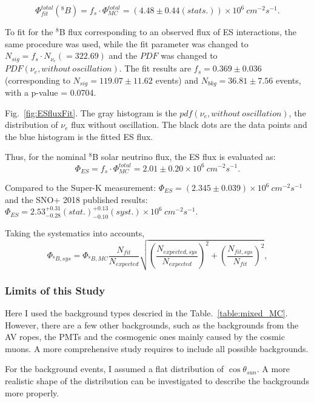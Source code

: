 \begin{equation}
\Phi^{total}_{fit}(^8 B)=f_s\cdot \Phi^{total}_{MC}=(4.48\pm 0.44(stats.))\times 10^6~cm^{-2}s^{-1}.
\end{equation}

To fit for the $^8$B flux corresponding to an observed flux of ES interactions, the same procedure was used, while the fit parameter was changed to $N_{sig}=f_s\cdot N_{\nu_e}(=322.69)$ and the $PDF$ was changed to $PDF(\nu_e,without~oscillation)$. The fit results are $f_s=0.369\pm 0.036$ (corresponding to $N_{sig}=119.07\pm11.62$ events) and $N_{bkg}=36.81\pm 7.56$ events, with a p-value = 0.0704.

Fig.~\ref{fig:ESfluxFit}. The gray histogram is the $pdf(\nu_e,without~oscillation)$, the distribution of $\nu_e$ flux without oscillation. The black dots are the data points and the blue histogram is the fitted ES flux.

Thus, for the nominal $^8$B solar neutrino flux, the ES flux is evaluated as:
\begin{equation}
\Phi_{ES}=f_s\cdot \Phi^{total}_{MC}=2.01\pm 0.20\times 10^6~cm^{-2}s^{-1}.
\end{equation}


Compared to the Super-K measurement: $\Phi_{ES}=(2.345\pm0.039)\times 10^6~cm^{-2}s^{-1}$ and the SNO+ 2018 published results: $\Phi_{ES}=2.53^{+0.31}_{-0.28}(stat.)^{+0.13}_{-0.10}(syst.)\times 10^6~cm^{-2}s^{-1}$.



Taking the systematics into accounts,
\begin{equation}
\Phi_{^8B,sys} = \Phi_{^8B,MC}\frac{N_{fit}}{N_{expected}}\sqrt{(\frac{N_{expected,sys}}{N_{expected}})^2+(\frac{N_{fit,sys}}{N_{fit}})^2},
\end{equation}



\subsubsection{Limits of this Study}
Here I used the background types descried in the Table.~\ref{table:mixed_MC}. However, there are a few other backgrounds, such as the backgrounds from the AV ropes, the PMTs and the cosmogenic ones mainly caused by the cosmic muons. A more comprehensive study requires to include all possible backgrounds.

For the background events, I assumed a flat distribution of $\cos\theta_{sun}$. A more realistic shape of the distribution can be investigated to describe the backgrounds more properly.  


